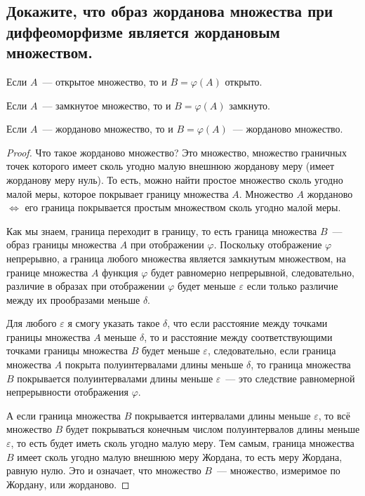 
\subsection{Докажите, что образ жорданова множества при диффеоморфизме является жордановым множеством.}

Если $A$~--- открытое множество, то и $B = \varphi(A)$ открыто.

Если $A$~--- замкнутое множество, то и $B = \varphi(A)$ замкнуто.

\begin{theorem*}
    Если $A$~--- жорданово множество, то и $B = \varphi(A)$~--- жорданово множество.
\end{theorem*}
\begin{proof}
    Что такое жорданово множество? Это множество, множество граничных точек которого имеет сколь угодно малую внешнюю жорданову меру (имеет жорданову меру нуль). То есть, можно найти простое множество сколь угодно малой меры, которое покрывает границу множества $A$. Множество $A$ жорданово $\iff$ его граница покрывается простым множеством сколь угодно малой меры.
    
    Как мы знаем, граница переходит в границу, то есть граница множества $B$~--- образ границы множества $A$ при отображении $\varphi$. Поскольку отображение $\varphi$ непрерывно, а граница любого множества является замкнутым множеством, на границе множества $A$ функция $\varphi$ будет равномерно непрерывной, следовательно, различие в образах при отображении $\varphi$ будет меньше $\varepsilon$ если только различие между их прообразами меньше $\delta$.
    
    Для любого $\varepsilon$ я смогу указать такое $\delta$, что если расстояние между точками границы множества $A$ меньше $\delta$, то и расстояние между соответствующими точками границы множества $B$ будет меньше $\varepsilon$, следовательно, если граница множества $A$ покрыта полуинтервалами длины меньше $\delta$, то граница множества $B$ покрывается полуинтервалами длины меньше $\varepsilon$~--- это следствие равномерной непрерывности отображения $\varphi$.
    
    А если граница множества $B$ покрывается интервалами длины меньше $\varepsilon$, то всё множество $B$ будет покрываться конечным числом полуинтервалов длины меньше $\varepsilon$, то есть будет иметь сколь угодно малую меру. Тем самым, граница множества $B$ имеет сколь угодно малую внешнюю меру Жордана, то есть меру Жордана, равную нулю. Это и означает, что множество $B$~--- множество, измеримое по Жордану, или жорданово.

    
\end{proof}